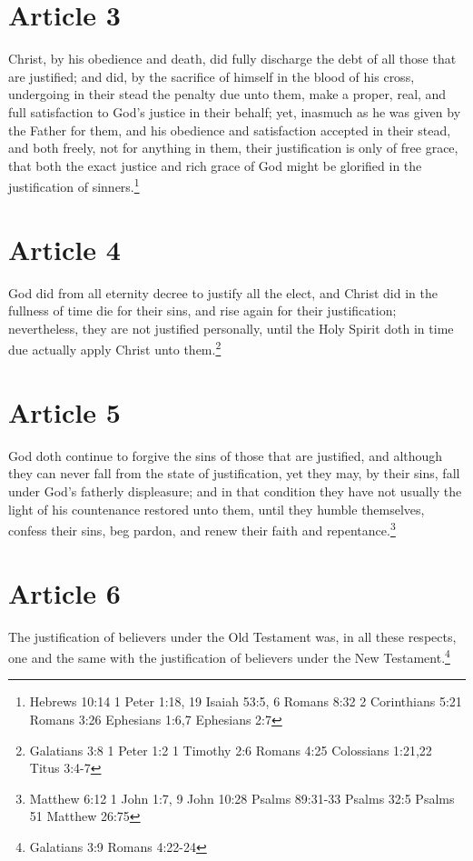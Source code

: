 \documentclass[12pt,letterpaper]{book}
\begin{document}
\section{Article 3}

Christ, by his obedience and death, did fully discharge the debt of all those that are justified; and did, by the sacrifice of himself in the blood of his cross, undergoing in their stead the penalty due unto them, make a proper, real, and full satisfaction to God's justice in their behalf; yet, inasmuch as he was given by the Father for them, and his obedience and satisfaction accepted in their stead, and both freely, not for anything in them, their justification is only of free grace, that both the exact justice and rich grace of God might be glorified in the justification of sinners.\footnote{Hebrews 10:14 1 Peter 1:18, 19 Isaiah 53:5, 6 Romans 8:32 2 Corinthians 5:21 Romans 3:26 Ephesians 1:6,7 Ephesians 2:7}

\section{Article 4}

God did from all eternity decree to justify all the elect, and Christ did in the fullness of time die for their sins, and rise again for their justification; nevertheless, they are not justified personally, until the Holy Spirit doth in time due actually apply Christ unto them.\footnote{Galatians 3:8 1 Peter 1:2 1 Timothy 2:6 Romans 4:25 Colossians 1:21,22 Titus 3:4-7}

\section{Article 5}

God doth continue to forgive the sins of those that are justified, and although they can never fall from the state of justification, yet they may, by their sins, fall under God's fatherly displeasure; and in that condition they have not usually the light of his countenance restored unto them, until they humble themselves, confess their sins, beg pardon, and renew their faith and repentance.\footnote{Matthew 6:12 1 John 1:7, 9 John 10:28 Psalms 89:31-33 Psalms 32:5 Psalms 51 Matthew 26:75}

\section{Article 6}

The justification of believers under the Old Testament was, in all these respects, one and the same with the justification of believers under the New Testament.\footnote{Galatians 3:9 Romans 4:22-24}
\end{document}
